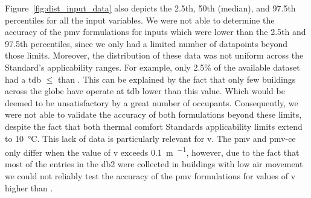 Figure~\ref{fig:dist_input_data} also depicts the 2.5th, 50th (median), and 97.5th percentiles for all the input variables.
We were not able to determine the accuracy of the \ac{pmv} formulations for inputs which were lower than the 2.5th and 97.5th percentiles, since we only had a limited number of datapoints beyond those limits.
Moreover, the distribution of these data was not uniform across the Standard's applicability ranges.
For example, only 2.5\% of the available dataset had a \ac{tdb} $\leq$ than .
This can be explained by the fact that only few buildings across the globe have operate at \ac{tdb} lower than this value.
Which would be deemed to be unsatisfactory by a great number of occupants.
Consequently, we were not able to validate the accuracy of both formulations beyond these limits, despite the fact that both thermal comfort Standards applicability limits extend to \qty{10}{\celsius}.
This lack of data is particularly relevant for \ac{v}.
The \ac{pmv} and \gls{pmv-ce} only differ when the value of \ac{v} exceeds \qty{0.1}{\m\per\sec}, however, due to the fact that most of the entries in the \gls{db2} were collected in buildings with low air movement we could not reliably test the accuracy of the \ac{pmv} formulations for values of \ac{v} higher than .

